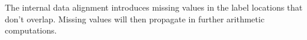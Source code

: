 \chapter{\label{Ch05}}
\section{}
\subsection{}
The internal data alignment introduces missing values in the label locations that don’t overlap. Missing values will then propagate in further arithmetic computations.